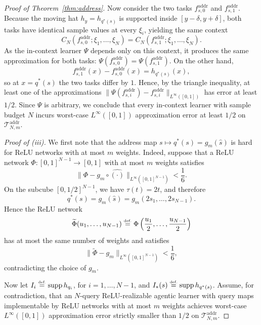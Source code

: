 \documentclass{article}
\newcommand{\eqdef }{\ensuremath{\stackrel{\mbox{\upshape\tiny def.}}{=}}}
\begin{document}
\begin{proof}[Proof of Theorem~\ref{thm:address}]
Now consider the two tasks $f^{\mathrm{addr}}_{s,0}$ and $f^{\mathrm{addr}}_{s,1}$. Because the moving hat $h_y=h_{q^\ast(s)}$
is supported inside $[y-\delta,y+\delta]$,
both tasks have identical sample values at every
$\xi_i$, yielding the same context 
\begin{equation*}
    C_N(f^{\mathrm{addr}}_{s,0};\xi_1,\dots,\xi_N)
    = C_N(f^{\mathrm{addr}}_{s,1};\xi_1,\dots,\xi_N).
\end{equation*}
As the in-context learner $\Psi$ depends only on this context, it produces the same approximation for both tasks: $\Psi(f^{\mathrm{addr}}_{s,0})=\Psi(f^{\mathrm{addr}}_{s,1})$. 
On the other hand,
\[
f^{\mathrm{addr}}_{s,1}(x)-f^{\mathrm{addr}}_{s,0}(x)=h_{q^\ast(s)}(x),
\]
so at $x=q^\ast(s)$ the two tasks differ by $1$. 
Hence, by the triangle inequality, at least one of the approximations $\|\Psi(f^{\mathrm{addr}}_{s,i})-f^{\mathrm{addr}}_{s,i}\|_{L^{\infty}([0,1])}$ has error
at least $1/2$.
Since $\Psi$ is arbitrary, we conclude that every in-context learner with sample budget $N$ incurs worst-case $L^{\infty}([0,1])$ approximation error at least $1/2$ on $\mathcal T_{N,m}^{\mathrm{addr}}$.

\medskip
\noindent

\emph{Proof of (iii).}
We first note that the %
address map
$
s\mapsto q^\ast(s)=g_m(\widehat s)
$
is %
hard for ReLU networks with at most \(m\) weights. Indeed, suppose that a ReLU network
\(\Phi:[0,1]^{N-1}\to[0,1]\) with at most \(m\) weights satisfies
\[
\|\Phi-g_m\circ \widehat{(\cdot)}\|_{L^\infty([0,1]^{N-1})}<\frac16.
\]
On the subcube \([0,1/2]^{N-1}\), we have \(\tau(t)=2t\), and therefore
\[
    q^\ast(s)=g_m(\widehat{s})=g_m(2s_1,\dots,2s_{N-1}).
\]
Hence the ReLU network
\[
\widetilde \Phi(u_1,\dots,u_{N-1})
\eqdef 
\Phi\left(\frac{u_1}{2},\dots,\frac{u_{N-1}}{2}\right)
\]
has at most the same number of weights and satisfies
\[
\|\widetilde \Phi-g_m\|_{L^\infty([0,1]^{N-1})}<\frac16,
\]
contradicting the choice of \(g_m\).

Now let \(I_i\eqdef  \operatorname{supp}h_{q_i}\), for \(i=1,\dots,N-1\), and
$
    I_*(s)\eqdef  \operatorname{supp}h_{q^\ast(s)}
$.
Assume, for contradiction, that an \(N\)-query ReLU-realizable agentic learner with query maps implementable by ReLU networks with at most \(m\) weights achieves worst-case $L^{\infty}([0,1])$ approximation error strictly smaller than \(1/2\) on $\mathcal T_{N,m}^{\mathrm{addr}}$.


\end{proof}
\end{document}
